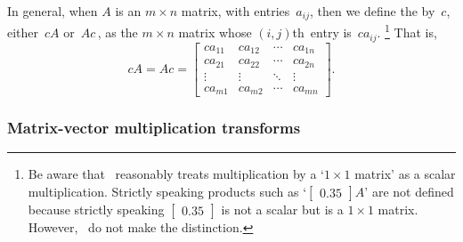 In general, when \(A\) is an \(m\times n\) matrix, with entries~\(a_{ij}\), then we define the  by~\(c\), either~\(cA\) or~\(Ac\)\,, as the \(m\times n\) matrix whose \((i,j)\)th~entry is~\(ca_{ij}\).
\footnote{Be aware that \script\ reasonably treats multiplication by a `\(1\times 1\) matrix' as a scalar multiplication.  
Strictly speaking products such as `\(\begin{bmatrix} 0.35 \end{bmatrix}A\)' are not defined because strictly speaking \(\begin{bmatrix} 0.35 \end{bmatrix}\) is not a scalar but is a \(1\times 1\) matrix.
However, \script\ do not make the distinction.}
That is,
\begin{equation*}
cA=Ac=\begin{bmatrix} ca_{11}&ca_{12}&\cdots&ca_{1n}
\\ca_{21}&ca_{22}&\cdots&ca_{2n}
\\\vdots&\vdots&\ddots&\vdots
\\ca_{m1}&ca_{m2}&\cdots&ca_{mn} \end{bmatrix}.
\end{equation*}




\subsubsection{Matrix-vector multiplication transforms}


